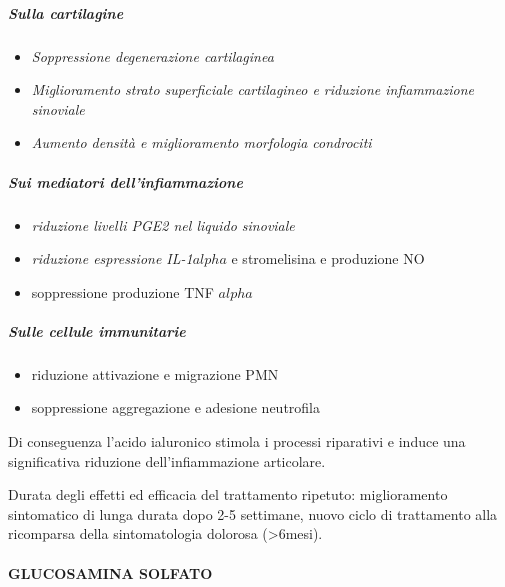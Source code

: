 \subparagraph{Sulla cartilagine}


\begin{itemize}
\item
  
  \emph{Soppressione degenerazione cartilaginea}
  
\item
  
  \emph{Miglioramento strato superficiale cartilagineo e riduzione
  infiammazione sinoviale}
  
\item
  
  \emph{Aumento densità e miglioramento morfologia condrociti}
  
\end{itemize}
\subparagraph{Sui mediatori dell'infiammazione}

\begin{itemize}
\item
  
  \emph{riduzione livelli PGE2 nel liquido sinoviale}
  
\item
  
  \emph{riduzione espressione IL-1$alpha$} e stromelisina e produzione NO
  
\item
  
  soppressione produzione TNF $alpha$
  
\end{itemize}
\subparagraph{Sulle cellule
immunitarie}


\begin{itemize}
\item
  
  riduzione attivazione e migrazione PMN
  
\item
  
  soppressione aggregazione e adesione neutrofila
  
\end{itemize}

Di conseguenza l'acido ialuronico stimola i processi riparativi e induce
una significativa riduzione dell'infiammazione articolare.

Durata degli effetti ed efficacia del trattamento ripetuto:
miglioramento sintomatico di lunga durata dopo 2-5 settimane, nuovo ciclo di trattamento alla ricomparsa della
sintomatologia dolorosa (\textgreater{}6mesi).

\paragraph{GLUCOSAMINA SOLFATO}


